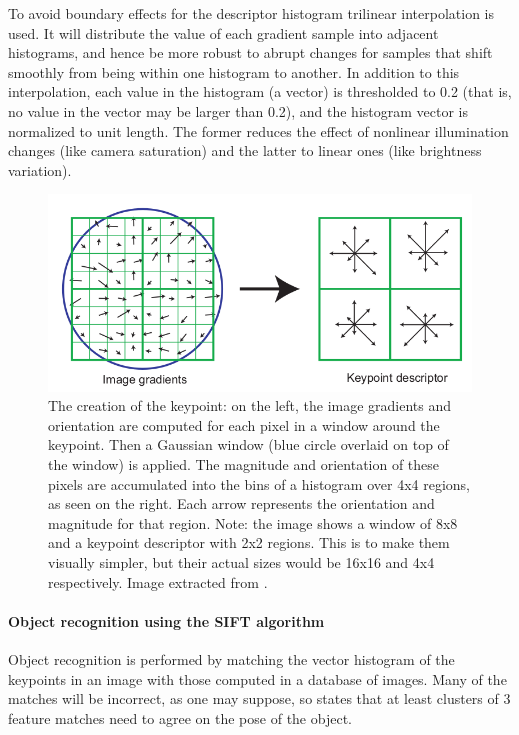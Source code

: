 \documentclass[../main.tex]{subfiles}
\begin{document}
To avoid boundary effects for the descriptor histogram trilinear interpolation is used. It will distribute the value of each gradient sample into adjacent histograms, and hence be more robust to abrupt changes for samples that shift smoothly from being within one histogram to another. In addition to this interpolation, each value in the histogram (a vector) is thresholded to 0.2 (that is, no value in the vector may be larger than 0.2), and the histogram vector is normalized to unit length. The former reduces the effect of nonlinear illumination changes (like camera saturation) and the latter to linear ones (like brightness variation).
\begin{figure}[htbp]
    \centering
    \includegraphics[width=0.8\linewidth]{images/SIFT_keypoint_descriptor.png}
    \caption{The creation of the keypoint: on the left, the image gradients and orientation are computed for each pixel in a window around the keypoint. Then a Gaussian window (blue circle overlaid on top of the window) is applied. The magnitude and orientation of these pixels are accumulated into the bins of a histogram  over 4x4 regions, as seen on the right. Each arrow represents the orientation and magnitude for that region. Note: the image shows a window of 8x8 and a keypoint descriptor with 2x2 regions. This is to make them visually simpler, but their actual sizes would be 16x16 and 4x4 respectively. Image extracted from \cite{SIFTlowe2004}.}
    \label{fig:SIFT_keypoint_descriptor}
\end{figure}

\paragraph{Object recognition using the SIFT algorithm} Object recognition is performed by matching the vector histogram of the keypoints in an image with those computed in a database of images. Many of the matches will be incorrect, as one may suppose, so \cite{SIFTlowe2004} states that at least clusters of 3 feature matches need to agree on the pose of the object.
\end{document}
